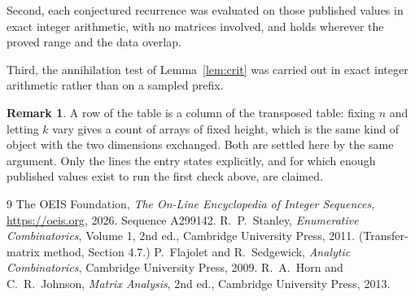 \documentclass[11pt,a4paper]{article}
\theoremstyle{plain}
\theoremstyle{definition}
\newtheorem{remark}[theorem]{Remark}
\begin{document}
Second, each conjectured recurrence was evaluated on those published values in exact
integer arithmetic, with no matrices involved, and holds wherever the proved range and the
data overlap.

Third, the annihilation test of Lemma~\ref{lem:crit} was carried out in exact integer
arithmetic rather than on a sampled prefix.

\begin{remark}
A row of the table is a column of the transposed table: fixing $n$ and letting $k$ vary gives a
count of arrays of fixed height, which is the same kind of object with the two dimensions
exchanged. Both are settled here by the same argument. Only the lines the entry states
explicitly, and for which enough published values exist to run the first check above, are
claimed.
\end{remark}

\begin{thebibliography}{9}
 The OEIS Foundation, \emph{The On-Line Encyclopedia of Integer
Sequences}, \url{https://oeis.org}, 2026. Sequence A299142.
 R.~P.~Stanley, \emph{Enumerative Combinatorics}, Volume 1, 2nd ed.,
Cambridge University Press, 2011. (Transfer-matrix method, Section 4.7.)
 P.~Flajolet and R.~Sedgewick, \emph{Analytic Combinatorics}, Cambridge
University Press, 2009.
 R.~A.~Horn and C.~R.~Johnson, \emph{Matrix Analysis}, 2nd ed., Cambridge
University Press, 2013.
\end{thebibliography}
\end{document}
